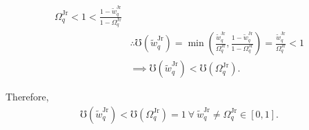 \documentclass[hidelinks, nonatbib]{elsarticle}
\begin{document}
\begin{enumerate}
\begin{align}
{        }{
            \Omega_{q}^{\text{Jr}}
        }
        <
        1
        <
        \frac{
            1 - \tilde{w}_{q}^{\text{Jr}}
        }{
            1 - \Omega_{q}^{\text{Jr}}
        }
        \\
        &\therefore
        \mho(\tilde{w}_{q}^{\text{Jr}}) 
        =
        \min\left(
            \frac{
                \tilde{w}_{q}^{\text{Jr}}
            }{
                \Omega_{q}^{\text{Jr}}
            }
            ,
            \frac{
                1 - \tilde{w}_{q}^{\text{Jr}}
            }{
                1 - \Omega_{q}^{\text{Jr}}
            }
        \right)
        =
        \frac{
            \tilde{w}_{q}^{\text{Jr}}
        }{
            \Omega_{q}^{\text{Jr}}
        }
        <
        1
        \\
        &\implies
        \mho(\tilde{w}_{q}^{\text{Jr}})
        <
        \mho(\Omega_{q}^{\text{Jr}})
        .
    \end{align}

    Therefore, 
    \begin{gather}
        \mho(\tilde{w}_{q}^{\text{Jr}}) < 
        \mho(\Omega_{q}^{\text{Jr}}) 
        = 1
        \
        \forall
        \
        \tilde{w}_{q}^{\text{Jr}}
        \neq
        \Omega_{q}^{\text{Jr}}
        \in [0,1]
        .
    \end{gather}


\end{enumerate}
\end{document}
